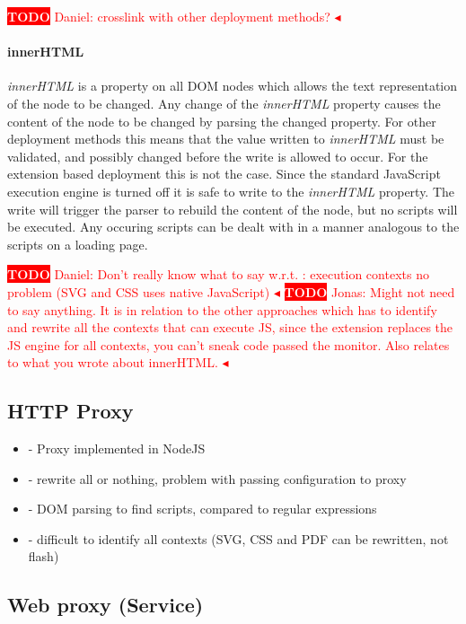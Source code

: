 \documentclass{llncs}
\newcommand{\todo}[1]{\colorbox{red}{\textcolor{white}{\sffamily\bfseries\scriptsize TODO}} \textcolor{red}{#1} \textcolor{red}{$\blacktriangleleft$}}
\begin{document}
\todo{Daniel: crosslink with other deployment methods?} \paragraph{innerHTML}
%
\emph{innerHTML} is a property on all DOM nodes which allows the text
representation of the node to be changed. Any change of the \emph{innerHTML}
property causes the content of the node to be changed by parsing the changed
property. For other deployment methods this means that the value written to
\emph{innerHTML} must be validated, and possibly changed before the write is
allowed to occur.  For the extension based deployment this is not the case.
Since the standard JavaScript execution engine is turned off it is safe to
write to the \emph{innerHTML} property. The write will trigger the parser to
rebuild the content of the node, but no scripts will be executed.  Any occuring
scripts can be dealt with in a manner analogous to the scripts on a loading
page.

\todo{Daniel: Don't really know what to say w.r.t. : execution contexts no problem (SVG and CSS uses native JavaScript)}
\todo{Jonas: Might not need to say anything. It is in relation to the other approaches 
which has to identify and rewrite all the contexts that can execute JS, since the 
extension replaces the JS engine for all contexts, you can't sneak code passed the monitor. Also relates to what you wrote about innerHTML.}


\subsection{HTTP Proxy}

\begin{itemize}
\item- Proxy implemented in NodeJS
\item- rewrite all or nothing, problem with passing configuration to proxy
\item- DOM parsing to find scripts, compared to regular expressions
\item- difficult to identify all contexts (SVG, CSS and PDF can be rewritten, not flash)
\end{itemize}



\subsection{Web proxy (Service)}
\end{document}
